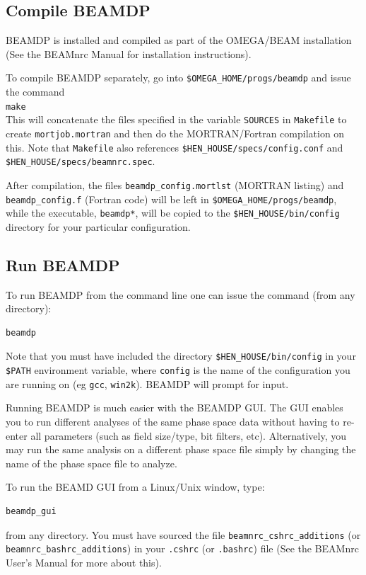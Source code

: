 \documentclass[12pt,twoside]{article}
\begin{document}
\subsection{Compile BEAMDP}

BEAMDP is installed and compiled as part of the OMEGA/BEAM installation
(See the BEAMnrc Manual\cite{Ro04a} for installation instructions).

To compile BEAMDP separately, go into
{\tt \$OMEGA\_HOME/progs/beamdp} and issue the command\\
{\tt make}\\
This will concatenate the files specified in the variable
{\tt SOURCES} in {\tt Makefile} to create {\tt mortjob.mortran}
and then do the MORTRAN/Fortran compilation on this.
Note that {\tt Makefile} also references {\tt \$HEN\_HOUSE/specs/config.conf}
and {\tt \$HEN\_HOUSE/specs/beamnrc.spec}.

After compilation, the files {\tt beamdp\_config.mortlst} (MORTRAN listing)
and {\tt beamdp\_config.f} (Fortran code) will be left in
{\tt \$OMEGA\_HOME/progs/beamdp}, while the executable, {\tt beamdp*}, will
be copied to the {\tt \$HEN\_HOUSE/bin/config} directory for your
particular configuration.

\subsection{Run BEAMDP}
To run BEAMDP from the command line one can issue the command
(from any directory):
\begin{verbatim}
beamdp
\end{verbatim}
Note that you must have included the directory
{\tt \$HEN\_HOUSE/bin/config} in your
{\tt \$PATH} environment variable, where {\tt config} is the name
of the configuration you are running on (eg {\tt gcc}, {\tt win2k}).
BEAMDP will prompt for input.

Running BEAMDP is much easier with the BEAMDP GUI\cite{Tr04}.  The GUI enables you
to run different analyses of the same phase space data without having to
re-enter all parameters (such as field size/type, bit filters, etc).
Alternatively, you may run the same analysis on a different phase space
file simply by changing the name of the phase space file to analyze.

To run the BEAMD GUI from a Linux/Unix window, type:
\begin{verbatim}
beamdp_gui
\end{verbatim}
from any directory.  You
must have sourced the file {\tt beamnrc\_cshrc\_additions} (or\\
{\tt beamnrc\_bashrc\_additions}) in your {\tt .cshrc} (or {\tt .bashrc})
file (See the BEAMnrc User's Manual\cite{Ro04a} for more about this).
\end{document}

